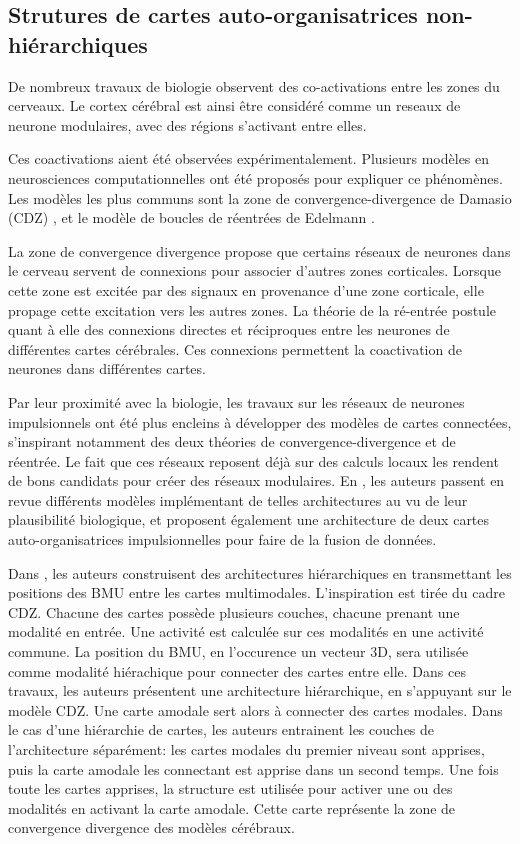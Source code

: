 \documentclass[../main]{subfiles}
\begin{document}
\subsection{Strutures de cartes auto-organisatrices non-hiérarchiques}

De nombreux travaux de biologie observent des co-activations entre les zones du cerveaux. Le cortex cérébral est ainsi être considéré comme un reseaux de neurone modulaires, avec des régions s'activant entre elles. \cite{primate_cortex_91,mountcastle_columnar_1997,Harriger2012RichCO}

Ces coactivations aient été observées expérimentalement. Plusieurs modèles en neurosciences computationnelles ont été proposés pour expliquer ce phénomènes. Les modèles les plus communs sont la zone de convergence-divergence de Damasio (CDZ) \cite{damasio_time-locked_1989}, et le modèle de boucles de réentrées de Edelmann \cite{Edelman1982GroupSA}.

La zone de convergence divergence propose que certains réseaux de neurones dans le cerveau servent de connexions pour associer d'autres zones corticales. Lorsque cette zone est excitée par des signaux en provenance d'une zone corticale, elle propage cette excitation vers les autres zones.
La théorie de la ré-entrée postule quant à elle des connexions directes et réciproques entre  les neurones de différentes cartes cérébrales. Ces connexions permettent la coactivation de neurones dans différentes cartes. 

Par leur proximité avec la biologie, les travaux sur les réseaux de neurones impulsionnels ont été plus encleins à développer des modèles de cartes connectées, s'inspirant notamment des deux théories de convergence-divergence et de réentrée. Le fait que ces réseaux reposent déjà sur des calculs locaux les rendent de bons candidats pour créer des réseaux modulaires. En \cite{electronics9101605}, les auteurs passent en revue différents modèles implémentant de telles architectures au vu de leur plausibilité biologique, et proposent également une architecture de deux cartes auto-organisatrices impulsionnelles pour faire de la fusion de données.


Dans \cite{dominey13}, les auteurs construisent des architectures hiérarchiques en transmettant les positions des BMU entre les cartes multimodales. L'inspiration est tirée du cadre CDZ.
Chacune des cartes possède plusieurs couches, chacune prenant une modalité en entrée. Une activité est calculée sur ces modalités en une activité commune. La position du BMU, en l'occurence un vecteur 3D, sera utilisée comme modalité hiérachique pour connecter des cartes entre elle. Dans ces travaux, les auteurs présentent une architecture hiérarchique, en s'appuyant sur le modèle CDZ. Une carte amodale sert alors à connecter des cartes modales.
Dans le cas d'une hiérarchie de cartes, les auteurs entrainent les couches de l'architecture séparément: les cartes modales du premier niveau sont apprises, puis la carte amodale les connectant est apprise dans un second temps. 
Une fois toute les cartes apprises, la structure est utilisée pour activer une ou des modalités en activant la carte amodale. Cette carte représente la zone de convergence divergence des modèles cérébraux. 
\end{document}
